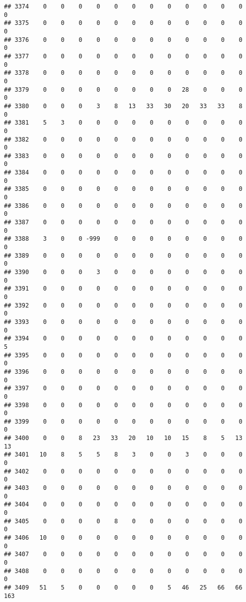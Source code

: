 \documentclass[]{article}
\begin{document}
\begin{verbatim}
## 3374    0    0    0    0    0    0    0    0    0    0    0    0    0
## 3375    0    0    0    0    0    0    0    0    0    0    0    0    0
## 3376    0    0    0    0    0    0    0    0    0    0    0    0    0
## 3377    0    0    0    0    0    0    0    0    0    0    0    0    0
## 3378    0    0    0    0    0    0    0    0    0    0    0    0    0
## 3379    0    0    0    0    0    0    0    0   28    0    0    0    0
## 3380    0    0    0    3    8   13   33   30   20   33   33    8    0
## 3381    5    3    0    0    0    0    0    0    0    0    0    0    0
## 3382    0    0    0    0    0    0    0    0    0    0    0    0    0
## 3383    0    0    0    0    0    0    0    0    0    0    0    0    0
## 3384    0    0    0    0    0    0    0    0    0    0    0    0    0
## 3385    0    0    0    0    0    0    0    0    0    0    0    0    0
## 3386    0    0    0    0    0    0    0    0    0    0    0    0    0
## 3387    0    0    0    0    0    0    0    0    0    0    0    0    0
## 3388    3    0    0 -999    0    0    0    0    0    0    0    0    0
## 3389    0    0    0    0    0    0    0    0    0    0    0    0    0
## 3390    0    0    0    3    0    0    0    0    0    0    0    0    0
## 3391    0    0    0    0    0    0    0    0    0    0    0    0    0
## 3392    0    0    0    0    0    0    0    0    0    0    0    0    0
## 3393    0    0    0    0    0    0    0    0    0    0    0    0    0
## 3394    0    0    0    0    0    0    0    0    0    0    0    0    5
## 3395    0    0    0    0    0    0    0    0    0    0    0    0    0
## 3396    0    0    0    0    0    0    0    0    0    0    0    0    0
## 3397    0    0    0    0    0    0    0    0    0    0    0    0    0
## 3398    0    0    0    0    0    0    0    0    0    0    0    0    0
## 3399    0    0    0    0    0    0    0    0    0    0    0    0    0
## 3400    0    0    8   23   33   20   10   10   15    8    5   13   13
## 3401   10    8    5    5    8    3    0    0    3    0    0    0    0
## 3402    0    0    0    0    0    0    0    0    0    0    0    0    0
## 3403    0    0    0    0    0    0    0    0    0    0    0    0    0
## 3404    0    0    0    0    0    0    0    0    0    0    0    0    0
## 3405    0    0    0    0    8    0    0    0    0    0    0    0    0
## 3406   10    0    0    0    0    0    0    0    0    0    0    0    0
## 3407    0    0    0    0    0    0    0    0    0    0    0    0    0
## 3408    0    0    0    0    0    0    0    0    0    0    0    0    0
## 3409   51    5    0    0    0    0    0    5   46   25   66   66  163

\end{verbatim}
\end{document}
